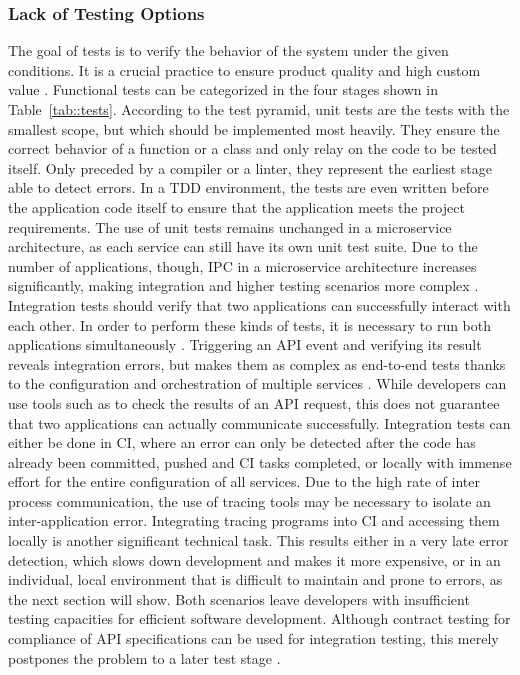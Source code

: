         \subsubsection{Lack of Testing Options}\label{sss::testing_problem}
        The goal of tests is to verify the behavior of the system under the given conditions. It is a crucial practice to ensure product quality and high custom value \cite{azuredevops}. Functional tests can be categorized in the four stages shown in Table~\ref{tab::tests}. According to the test pyramid, unit tests are the tests with the smallest scope, but which should be implemented most heavily. They ensure the correct behavior of a function or a class and only relay on the code to be tested itself. Only preceded by a compiler or a linter, they represent the earliest stage able to detect errors. In a \ac{TDD} environment, the tests are even written before the application code itself to ensure that the application meets the project requirements. The use of unit tests remains unchanged in a microservice architecture, as each service can still have its own unit test suite. Due to the number of applications, though, \ac{IPC} in a microservice architecture increases significantly, making integration and higher testing scenarios more complex \cite{microtest}. \newline
        Integration tests should verify that two applications can successfully interact with each other. In order to perform these kinds of tests, it is necessary to run both applications simultaneously \cite{azuredevops}. Triggering an \ac{API} event and verifying its result reveals integration errors, but makes them as complex as end-to-end tests thanks to the configuration and orchestration of multiple services \cite{microtest}. While developers can use tools such as  to check the results of an \ac{API} request, this does not guarantee that two applications can actually communicate successfully. Integration tests can either be done in \ac{CI}, where an error can only be detected after the code has already been committed, pushed and \ac{CI} tasks completed, or locally with immense effort for the entire configuration of all services. Due to the high rate of inter process communication, the use of tracing tools may be necessary to isolate an inter-application error. Integrating tracing programs into \ac{CI} and accessing them locally is another significant technical task. This results either in a very late error detection, which slows down development and makes it more expensive, or in an individual, local environment that is difficult to maintain and prone to errors, as the next section will show. Both scenarios leave developers with insufficient testing capacities for efficient software development. Although contract testing for compliance of \ac{API} specifications can be used for integration testing, this merely postpones the problem to a later test stage \cite{microtest}.\newline
